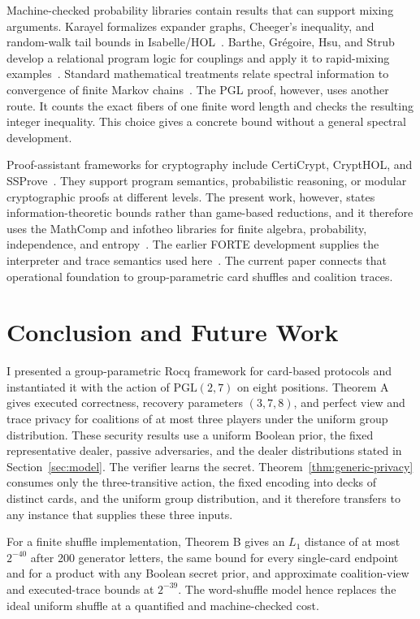 \documentclass[runningheads]{llncs}
\newcommand{\Rocq}{Rocq}
\newcommand{\PG}{\mathrm{PGL}(2,7)}
\begin{document}
Machine-checked probability libraries contain results that can support
mixing arguments. Karayel formalizes expander graphs, Cheeger's inequality,
and random-walk tail bounds in Isabelle/HOL~\cite{Karayel2023}. Barthe,
Gr\'egoire, Hsu, and Strub develop a relational program logic for couplings
and apply it to rapid-mixing examples~\cite{BartheEtAl2017}. Standard
mathematical treatments relate spectral information to convergence of
finite Markov chains~\cite{LevinPeresWilmer2009}. The PGL proof, however, uses another route. It counts the exact fibers of one finite word length and checks the
resulting integer inequality. This choice gives a concrete bound without a
general spectral development.

Proof-assistant frameworks for cryptography include CertiCrypt, CryptHOL, and
SSProve~\cite{CertiCrypt,CryptHOL,SSProve}. They support program semantics,
probabilistic reasoning, or modular cryptographic proofs at different
levels. The present work, however, states information-theoretic bounds rather
than game-based reductions, and it therefore uses the MathComp and
infotheo libraries for finite algebra, probability, independence, and
entropy~\cite{MathComp,InfoTheo}.
The earlier FORTE development supplies the interpreter and trace semantics
used here~\cite{WengEtAl2025}. The current paper connects that operational
foundation to group-parametric card shuffles and coalition traces.

\section{Conclusion and Future Work}\label{sec:conclusion}

I presented a group-parametric \Rocq{} framework for card-based protocols
and instantiated it with the action of $\PG$ on eight positions. Theorem A
gives executed correctness, recovery parameters $(3,7,8)$, and perfect view
and trace privacy for coalitions of at most three players under the uniform
group distribution. These security results use a uniform Boolean prior, the
fixed representative dealer, passive adversaries, and the dealer
distributions stated in Section~\ref{sec:model}. The verifier learns the
secret. Theorem~\ref{thm:generic-privacy} consumes only the
three-transitive action, the fixed encoding into decks of distinct
cards, and the uniform group distribution, and it therefore transfers to
any instance that supplies these three inputs.

For a finite shuffle implementation, Theorem B gives an $L_1$
distance of at most $2^{-40}$ after 200 generator letters, the same bound
for every single-card endpoint and for a product with any Boolean secret
prior, and approximate coalition-view and executed-trace bounds at
$2^{-39}$. The word-shuffle model hence replaces the ideal uniform
shuffle at a quantified and machine-checked cost.
\end{document}
